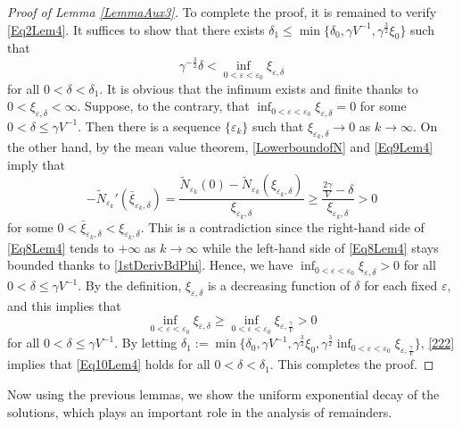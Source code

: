 \documentclass{amsart}
\newcommand{\veps}{\varepsilon}
\numberwithin{equation}{section}
\theoremstyle{plain}%
\theoremstyle{definition}
\theoremstyle{remark}
\theoremstyle{remark}
\begin{document}
\begin{proof}[Proof of Lemma \ref{LemmaAux3}]
 To complete the proof, it is remained to verify \eqref{Eq2Lem4}. It suffices to show that there exists $\delta_1 \leq \min\{\delta_0,\gamma V^{-1}, \gamma^{\frac{3}{2}}\xi_0\}$ such that 
\begin{equation}\label{Eq10Lem4}
\gamma^{-\frac{3}{2}}\delta < \inf_{0<\veps<\veps_0}\xi_{\veps,\delta}
\end{equation}
for all $0<\delta<\delta_1$.
It is obvious that the infimum exists and finite thanks to $0<\xi_{\veps,\delta}<\infty$.
 Suppose, to the contrary, that $\inf_{0<\veps<\veps_0}\xi_{\veps,\delta}=0$ for some $0<\delta \leq \gamma V^{-1}$.   
Then there is a sequence $\{\veps_k\}$ such that $\xi_{\veps_k,\delta} \to 0$ as $k \to \infty$. On the other hand, by the mean value theorem, \eqref{LowerboundofN} and \eqref{Eq9Lem4} imply that 
\begin{equation}\label{Eq8Lem4}
-\widetilde{N}_{\veps_k}'(\bar{\xi}_{\veps_k,\delta}) =\frac{\widetilde{N}_{\veps_k}(0)-\widetilde{N}_{\veps_k}(\xi_{\veps_k,\delta})}{\xi_{\veps_k,\delta}} \geq \frac{\frac{2\gamma}{V}-\delta}{\xi_{\veps_k,\delta}}>0
\end{equation}
for some $0<\bar{\xi}_{\veps_k,\delta}<\xi_{\veps_k,\delta}$. This is a contradiction since the right-hand side of \eqref{Eq8Lem4} tends to $+\infty$ as $k \to \infty$ while the left-hand side of \eqref{Eq8Lem4} stays bounded thanks to \eqref{1stDerivBdPhi}. Hence, we   have $\inf_{0<\veps<\veps_0}\xi_{\veps,\delta}>0$ for all $0<\delta \leq\gamma V^{-1}$. By the definition, $\xi_{\veps,\delta}$ is a decreasing function of $\delta$ for each fixed $\veps$, and this implies that 
\begin{equation}\label{222}
\inf_{0 < \veps<\veps_0}\xi_{\veps,\delta} \geq \inf_{0 < \veps<\veps_0}\xi_{\veps,\frac{\gamma}{V}}>0
\end{equation}
for all $0 < \delta \leq \gamma V^{-1}$. By letting $\delta_1:=\min\{\delta_0,\gamma V^{-1},\gamma^{\frac{3}{2}}\xi_0,\gamma^{\frac{3}{2}}\inf_{0<\veps<\veps_0}\xi_{\veps,\frac{\gamma}{V}}\}$, \eqref{222} implies that \eqref{Eq10Lem4} holds for all $0<\delta<\delta_1$.
This completes the proof.
\end{proof}
Now using the previous lemmas, we  show the uniform exponential decay of the solutions, which plays an important role in the analysis of remainders. 
\end{document}
